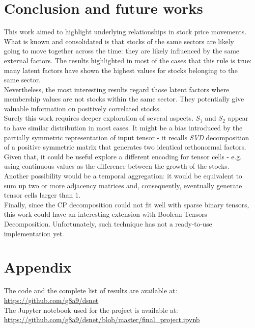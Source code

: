 \documentclass[12pt]{extarticle}
\begin{document}
\section{Conclusion and future works}

This work aimed to highlight underlying relationships in stock price movements. What is known and consolidated is that stocks of the same sectors are likely going to move together across the time: they are likely influenced by the same external factors. The results highlighted in most of the cases that this rule is true: many latent factors have shown the highest values for stocks belonging to the same sector.\\
Nevertheless, the most interesting results regard those latent factors where membership values are not stocks within the same sector. They potentially give valuable information on positively correlated stocks.\\
Surely this work requires deeper exploration of several aspects. $S_1$ and $S_2$ appear to have similar distribution in most cases. It might be a bias introduced by the partially symmetric representation of input tensor - it recalls \textit{SVD} decomposition of a positive symmetric matrix that generates two identical orthonormal factors. Given that, it could be useful explore a different encoding for tensor cells - e.g. using continuous values as the difference between the growth of the stocks. Another possibility would be a temporal aggregation: it would be equivalent to sum up two or more adjacency matrices and, consequently, eventually generate tensor cells larger than 1.\\
Finally, since the CP decomposition could not fit well with sparse binary tensors, this work could have an interesting extension with Boolean Tensors Decomposition. Unfortunately, such technique has not a ready-to-use implementation yet.

\section{Appendix}

The code and the complete list of results are available at:\\ \href{https://github.com/g8a9/dsnet}{https://github.com/g8a9/dsnet}\\
The Jupyter notebook used for the project is available at:\\
\href{https://github.com/g8a9/dsnet/blob/master/final_project.ipynb}{https://github.com/g8a9/dsnet/blob/master/final\_project.ipynb}



\end{document}
